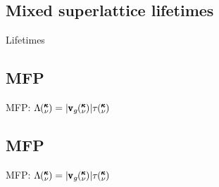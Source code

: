 \documentclass{beamer}
\newcommand{\kv}{\mspace{-4.0mu}\left(\mspace{-8.0mu}
\begin{smallmatrix}&\pmb{\kappa} \\&\nu\end{smallmatrix}
\mspace{-3.0mu}\right)}
\begin{document}
\subsection{Mixed superlattice lifetimes}
\begin{frame}{Lifetimes}
\begin{figure}[!h]
\begin{center}
\vspace*{-0.8cm}
\hspace*{-1cm}
\renewcommand{\figure}{Fig.}
\label{fig:lifetimes}
\end{center}
\end{figure}
\end{frame}

\subsection{MFP}
\begin{frame}{MFP: $\Lambda \kv=|{\pmb{\mathrm{v}}_{g}\kv}|{\tau\kv}$}
\begin{figure}[t]
\begin{center}
\vspace*{-0.6cm}
\renewcommand{\figure}{Fig.}
\label{fig:mfp_contribution}
\end{center}
\end{figure}
\end{frame}

\subsection{MFP}
\begin{frame}{MFP: $\Lambda \kv=|{\pmb{\mathrm{v}}_{g}\kv}|{\tau\kv}$}
\begin{figure}[t]
\begin{center}
\vspace*{-0.6cm}
\renewcommand{\figure}{Fig.}
\label{fig:mfp_contribution}
\end{center}
\end{figure}
\end{frame}
\end{document}

